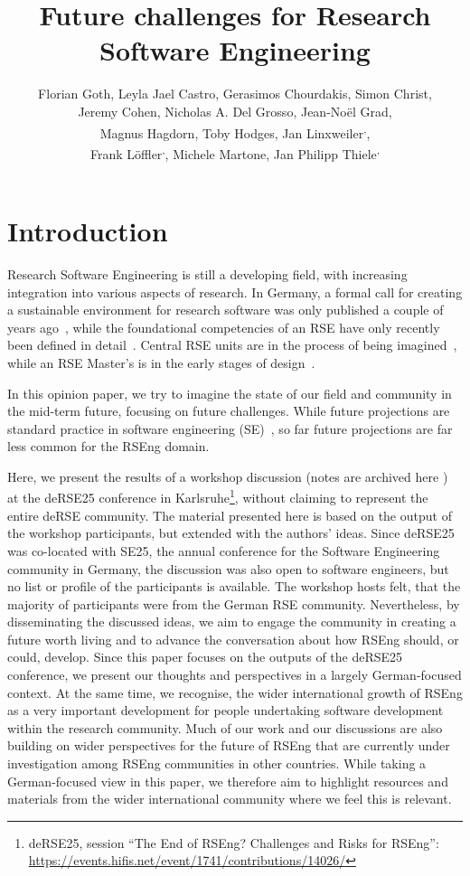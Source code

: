 \documentclass{eceasst}
\title{Future challenges for Research Software Engineering} %
\author{
Florian Goth\authorOrcid{0000-0003-2707-4790}\authorRef{1},
Leyla Jael Castro\authorOrcid{0000-0003-3986-0510}\authorRef{2},
Gerasimos Chourdakis\authorOrcid{0000-0002-3977-1385}\authorRef{3},
Simon Christ\authorOrcid{0000-0002-5866-1472}\authorRef{4},
\texorpdfstring{\\}{} %
Jeremy Cohen\authorOrcid{0000-0003-4312-2537}\authorRef{5},
Nicholas A. Del Grosso\thinspace\authorRef{6},
Jean-Noël Grad\authorOrcid{0000-0002-5821-4912}\authorRef{7},
\texorpdfstring{\\}{} %
Magnus Hagdorn\authorOrcid{0000-0002-5076-4864}\authorRef{8},
Toby Hodges\authorOrcid{0000-0003-1766-456X}\authorRef{9},
Jan Linxweiler\authorOrcid{0000-0002-2755-5087}\authorRef{10}\textsuperscript{,}\authorRef{11},
\texorpdfstring{\\}{} %
Frank Löffler\authorOrcid{0000-0001-6643-6323}\authorRef{12}\textsuperscript{,}\authorRef{11},
Michele Martone\authorOrcid{0000-0003-3239-8554}\authorRef{13},
Jan Philipp Thiele\authorOrcid{0000-0002-8901-6660}\authorRef{10}\textsuperscript{,}\authorRef{14}
} %
\institute{%
\autlabel{1} Institut für theoretische Physik 1, University of Würzburg, 97074, Würzburg, Germany\\
\autlabel{2} ZB MED Information Centre for Life Sciences, Cologne, Germany\\
\autlabel{3} Institute for Parallel and Distributed Systems, University of Stuttgart, Stuttgart, Germany\\
\autlabel{4} Leibniz University Hannover, Department of Cell Biology and Biophysics, Computational Biology, Germany\\
\autlabel{5} Imperial College London, London, UK\\
\autlabel{6} Institute for Experimental Epileptology and Cognition Research, Uniklinikum Bonn, Germany\\
\autlabel{7} Institute for Computational Physics, University of Stuttgart, Germany\\
\autlabel{8} Geschäftsbereich IT, Charité Universitätsmedizin Berlin, Germany\\
\autlabel{9} The Carpentries, USA\\
\autlabel{10} Technische Universität Braunschweig, Germany\\
\autlabel{11} de-RSE e.V.---Society for Research Software in Germany\\
\autlabel{12} Competence Center Digital Research, Friedrich Schiller University Jena, Germany\\
\autlabel{13} Independent researcher, Germany\\
\autlabel{14} Weierstrass Institute, Berlin, Germany;
              Leibniz University Hannover, Institute of Applied Mathematics, Scientific Computing, Hannover, Germany\\
}
\begin{document}
\maketitle

\section{Introduction}

Research Software Engineering is still a developing field,
with increasing integration into various aspects of research.
In Germany, a formal call for creating a sustainable environment for research software
was only published a couple of years ago~\cite{Anzt2021},
while the foundational competencies of an RSE have only recently been defined in detail~\cite{Goth2024}.
Central RSE units are in the process of being imagined~\cite{Kempf2025-draft},
while an RSE Master's is in the early stages of design~\cite{Dehne2025-draft}.

In this opinion paper, we try to imagine the state of our field
and community in the mid-term future, focusing on future challenges.
While future projections are standard practice in software engineering (SE)~\cite{Katz2023,Khan2021,Hu2023,Bosch2016a,Boehm2011},
so far future projections are far less common for the RSEng domain.

Here, we present the results of a workshop discussion (notes are archived here \cite{goth2025_WSPad}) at the
deRSE25 conference in Karlsruhe\footnote{deRSE25, session ``The End of {RSEng}?
Challenges and Risks for {RSEng}'': \url{https://events.hifis.net/event/1741/contributions/14026/}},
without claiming to represent the entire deRSE community.
The material presented here is based on the output of the workshop participants, but extended with the authors' ideas.
Since deRSE25 was co-located with SE25, the annual conference for the Software Engineering community in Germany, the discussion was also open to software engineers,
but no list or profile of the participants is available.
The workshop hosts felt, that the majority of participants were from the German RSE community.
Nevertheless, by disseminating the discussed ideas,
we aim to engage the community in creating a future worth living
and to advance the conversation about how RSEng should, or could, develop.
Since this paper focuses on the outputs of the deRSE25 conference, we present our thoughts and perspectives in a largely German-focused context.
At the same time, we recognise, the wider international growth of RSEng as a very important development
for people undertaking software development within the research community.
Much of our work and our discussions are also building on wider perspectives for the future of RSEng that are currently under
investigation among RSEng communities in other countries.
While taking a German-focused view in this paper, we therefore aim to highlight resources and materials from
the wider international community where we feel this is relevant.
\end{document}
